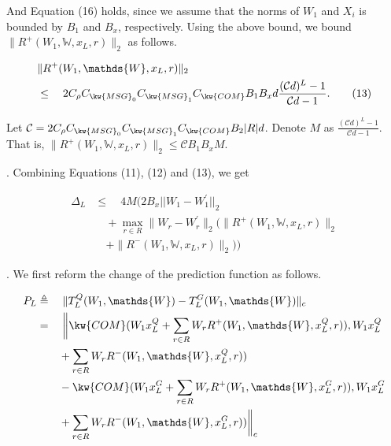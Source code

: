And Equation (16) holds, since 
we assume that 
the norms of $W_1$ and $X_i$
is bounded by $B_1$ and $B_x$, respectively.
%
Using the above bound, we bound $\|R^+(W_1,\mathds{W},x_L,r)\|_2$ %
as follows.

\begin{align*}
&  \|R^+(W_1,\mathds{W},x_L,r)\|_2 \\
 & \leq \quad 2C_\rho C_{\kw{MSG}_0}C_{\kw{MSG}_1}C_{\kw{COM}} B_1B_xd\frac{(\mathcal{C}d)^L-1}{\mathcal{C}d-1}. \tag{13}
\end{align*}

Let ${\mathcal C} = 2C_\rho C_{\kw{MSG}_0}C_{\kw{MSG}_1}C_{\kw{COM}} B_2 |R| d$.
Denote $M$ as $\frac{\left(\mathcal{C}d\right)^{L}-1}{\mathcal{C}d-1}$.
That is, $\|R^+(W_1,\mathds{W},x_L,r)\|_2  \leq {\mathcal C} B_1  B_xM$.


.
Combining Equations (11), (12) and (13), 
we get


\begin{align*}
	\Delta_{L} & \leq\quad 4M \bigg(2B_{x}||W_{1}-W_{1}^{\prime}||_{2}\\
	&\quad+\max_{r\in R}\|W_r-
	W_r^{\prime}\|_2(\|R^+(W_1,\mathds{W},x_L,r)\|_2\\
	&\quad+\|R^-(W_1,\mathds{W},x_L,r)\|_2)\bigg) \tag{14}
\end{align*}


.
We first reform the change of 
the prediction function as follows. 

\begin{equation*}\begin{aligned}
		P_{L} & \triangleq\quad\|T^Q_{L}(W_{1},\mathds{W})-T^G_{L}(W_{1},
		\mathds{W})\|_c \\
		& =\quad\bigg\|\kw{COM}(W_{1}x^Q_{L}+\sum_{r\in R} W_rR^+(W_{1},\mathds{W},x^Q_{L},r)), W_{1}x^Q_{L}\\
		& \quad\quad+\sum_{r\in R} W_rR^-(W_{1},\mathds{W},x^Q_{L},r))\\
			& \quad\quad-\kw{COM}(W_{1}x^G_{L}+\sum_{r\in R} W_rR^+(W_{1},\mathds{W},x^G_{L},r)), W_{1}x^G_{L}\\
			&\quad\quad+\sum_{r\in R} W_rR^-(W_{1},\mathds{W},x^G_{L},r)) \bigg\|_c\\
\end{aligned}\end{equation*}

